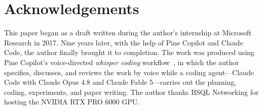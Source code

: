 \section*{Acknowledgements}
This paper began as a draft written during the author's internship at Microsoft Research in 2017.
Nine years later, with the help of Pine Copilot and Claude Code, the author finally brought it to completion.
The work was produced using Pine Copilot's voice-directed \emph{whisper coding}
workflow~\citep{pineai2026whispercoding}, in which the author specifies, discusses, and reviews
the work by voice while a coding agent---Claude Code with Claude Opus 4.8 and Claude Fable
5---carries out the planning, coding, experiments, and paper writing.
The author thanks BSQL Networking for hosting the NVIDIA RTX PRO 6000 GPU.

